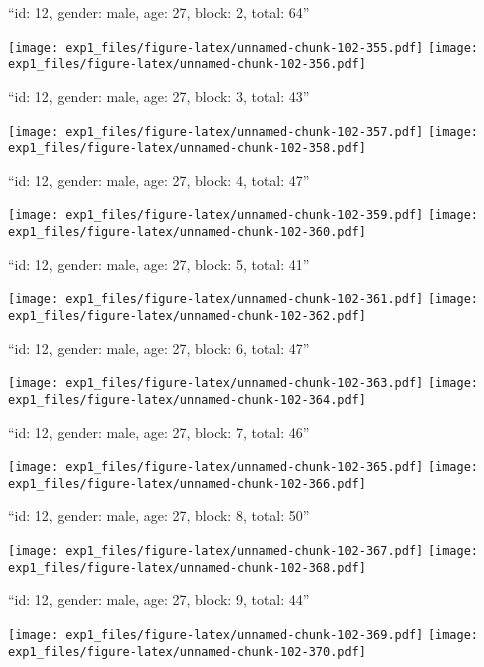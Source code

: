 \documentclass[11pt,,]{article}
\begin{document}
\newpage
[1] 

``id: 12, gender: male, age: 27, block: 2, total: 64''

\texttt{[image: exp1\_files/figure-latex/unnamed-chunk-102-355.pdf]}
\texttt{[image: exp1\_files/figure-latex/unnamed-chunk-102-356.pdf]}

\newpage
[1] 

``id: 12, gender: male, age: 27, block: 3, total: 43''

\texttt{[image: exp1\_files/figure-latex/unnamed-chunk-102-357.pdf]}
\texttt{[image: exp1\_files/figure-latex/unnamed-chunk-102-358.pdf]}

\newpage
[1] 

``id: 12, gender: male, age: 27, block: 4, total: 47''

\texttt{[image: exp1\_files/figure-latex/unnamed-chunk-102-359.pdf]}
\texttt{[image: exp1\_files/figure-latex/unnamed-chunk-102-360.pdf]}

\newpage
[1] 

``id: 12, gender: male, age: 27, block: 5, total: 41''

\texttt{[image: exp1\_files/figure-latex/unnamed-chunk-102-361.pdf]}
\texttt{[image: exp1\_files/figure-latex/unnamed-chunk-102-362.pdf]}

\newpage
[1] 

``id: 12, gender: male, age: 27, block: 6, total: 47''

\texttt{[image: exp1\_files/figure-latex/unnamed-chunk-102-363.pdf]}
\texttt{[image: exp1\_files/figure-latex/unnamed-chunk-102-364.pdf]}

\newpage
[1] 

``id: 12, gender: male, age: 27, block: 7, total: 46''

\texttt{[image: exp1\_files/figure-latex/unnamed-chunk-102-365.pdf]}
\texttt{[image: exp1\_files/figure-latex/unnamed-chunk-102-366.pdf]}

\newpage
[1] 

``id: 12, gender: male, age: 27, block: 8, total: 50''

\texttt{[image: exp1\_files/figure-latex/unnamed-chunk-102-367.pdf]}
\texttt{[image: exp1\_files/figure-latex/unnamed-chunk-102-368.pdf]}

\newpage
[1] 

``id: 12, gender: male, age: 27, block: 9, total: 44''

\texttt{[image: exp1\_files/figure-latex/unnamed-chunk-102-369.pdf]}
\texttt{[image: exp1\_files/figure-latex/unnamed-chunk-102-370.pdf]}
\end{document}
